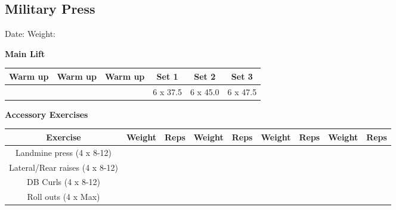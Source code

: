 \documentclass{article}%
\begin{document}
\subsection*{Military Press}%
Date: %
\linebreak%
Weight: %
\vspace*{20pt}%
\linebreak%
\begin{minipage}{0.5\textwidth}%
\textbf{Main Lift\newline%
\newline%
}%
\begin{tabular}{|c|c|c|c|c|c|}%
\hline%
Warm up&Warm up&Warm up&Set 1&Set 2&Set 3\\%
\hline%
&&&6 x 37.5&6 x 45.0&6 x 47.5\\%
\hline%
\end{tabular}%
\vspace*{20pt}%
\linebreak%
\textbf{Accessory Exercises\newline%
\newline%
}%
\begin{tabular}{|c|c|c|c|c|c|c|c|c|}%
\hline%
Exercise&Weight&Reps&Weight&Reps&Weight&Reps&Weight&Reps\\%
\hline%
Landmine press (4 x 8{-}12)&&&&&&&&\\%
\hline%
Lateral/Rear raises (4 x 8{-}12)&&&&&&&&\\%
\hline%
DB Curls (4 x 8{-}12)&&&&&&&&\\%
\hline%
Roll outs (4 x Max)&&&&&&&&\\%
\hline%
\end{tabular}%
\end{minipage}%
\vspace*{20pt}%
\linebreak

%
\end{document}
